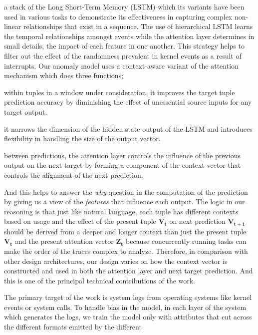 a stack of the Long Short-Term Memory (LSTM) \cite{hochreiter1997long} which 
its variants have been used in various tasks to demonstrate its effectiveness 
in capturing complex non-linear relationships that exist in a sequence. The use 
of hierarchical LSTM learns the temporal relationships amongst events while the 
attention layer determines in small details, the impact of each feature in one 
another. This strategy helps to filter out the effect of the randomness 
prevalent in kernel events as a result of interrupts. Our anomaly model uses a 
context-aware variant of the attention mechanism which does three functions; 
\begin{enumerate*}[label={\alph*)},font={\bfseries}]
	\item within tuples in a window under consideration, it improves the target 
	tuple prediction accuracy by diminishing the effect of unessential source 
	inputs for any target output.
	\item it narrows the dimension of the hidden state output of the LSTM and 
	introduces flexibility in handling the size of the output vector.
	\item between predictions, the attention layer controls the influence of 
	the previous output on the next target by forming a component of the 
	context vector that controls the alignment of the next prediction.
\end{enumerate*}
And this helps to answer the \emph{why} question in the 
computation of the prediction by giving us a view of the \emph{features} that 
influence each output. The logic in 
our reasoning is that just like natural language, each tuple has different 
contexts based on usage and the effect of the present tuple $ \bm{V_t} $ on 
next 
prediction $ \bm{V_{t+1}} $ should be derived from a deeper and longer context 
than 
just the present tuple $ \bm{V_t} $ and the present attention vector $ \bm{Z_t} 
$ because concurrently running tasks can make the order of the traces complex 
to analyze. 
Therefore, in comparison with other design architectures, our design varies on 
how the context vector is constructed and used in both the attention layer and 
next target prediction. And this is one of the principal technical 
contributions of the work. \par
The primary target of the work is system logs from operating systems like 
kernel events or system calls. To handle bias in the model, in each layer of 
the system which generates the logs, we train the model only 
with attributes that cut across the different formats emitted by the different 
